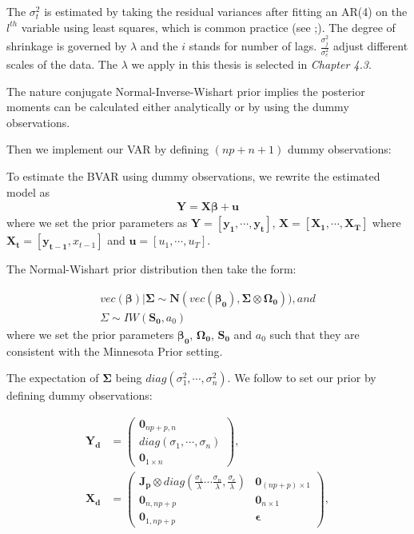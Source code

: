 \documentclass{monashthesis}
\begin{document}
The \(\sigma^2_{t}\) is estimated by taking the residual variances after fitting an AR(4) on the \(l^{th}\) variable using least squares, which is common practice (see \textcite{anderson2020};\textcite{banbura2010large}). The degree of shrinkage is governed by \(\lambda\) and the \(i\) stands for number of lags. \(\frac{\sigma^2_{j}}{\sigma^2_e}\) adjust different scales of the data. The \(\lambda\) we apply in this thesis is selected in \emph{Chapter 4.3}.

The nature conjugate Normal-Inverse-Wishart prior implies the posterior moments can be calculated either analytically or by using the dummy observations.

Then we implement our VAR by defining \((np+n+1)\) dummy observations:

To estimate the BVAR using dummy observations, we rewrite the estimated model as
\[
\begin{aligned}
\bm{Y} = \bm{X}\bm{\beta}+\bm{u}
\end{aligned}
\]
where we set the prior parameters as \(\bm{Y} = [\bm{y_1},\cdots,\bm{y_t}]\), \(\bm{X} = [\bm{X_1},\cdots,\bm{X_T}]\) where \(\bm{X_t}=[\bm{y_{t-1}}, x_{t-1}]\) and \(\bm{u} = [u_1,\cdots,u_T]\).

The Normal-Wishart prior distribution then take the form:

\[
\begin{aligned}
vec(\bm{\beta})|\bm{\Sigma} \sim \bm{N}(vec(\bm{\beta_0}),\bm{\Sigma}\otimes \bm{\Omega_0})), and\\
\Sigma \sim IW(\bm{S_0},a_0)
\end{aligned}
\]
where we set the prior parameters \(\bm{\beta_0}\), \(\bm{\Omega_0}\), \(\bm{S_0}\) and \(a_0\) such that they are consistent with the Minnesota Prior setting.

The expectation of \(\bm{\Sigma}\) being \(diag(\sigma^2_{1},\cdots,\sigma^2_{n})\). We follow \textcite{anderson2020} to set our prior by defining dummy observations:

\[
\begin{aligned}
\bm{Y_d}&=
\begin{pmatrix}
\bm0_{np+p,n}\\
diag({\sigma_1,\cdots,\sigma_n})\\
\bm0_{1\times n}
\end{pmatrix},\\
\bm{X_d}&=
\begin{pmatrix}
\bm{J_p}\otimes diag(\frac{\sigma_1}{\lambda}\cdots\frac{\sigma_n}{\lambda},\frac{\sigma_e}{\lambda})&\bm0_{(np+p)\times1}\\
\bm 0_{n,np+p}&\bm 0_{n\times1}
\\
\bm 0_{1,np+p}&\bm{\epsilon}
\end{pmatrix},
\end{aligned}
\]
\end{document}
